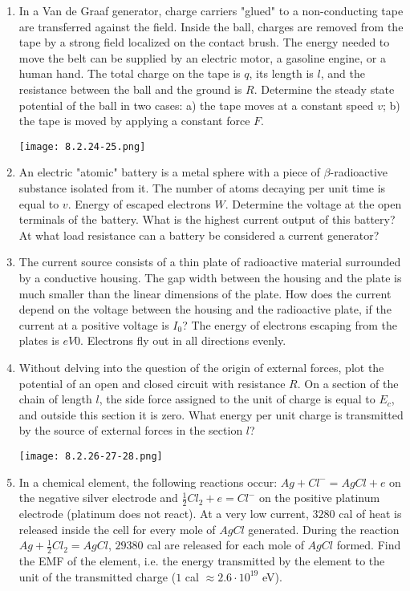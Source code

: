 \documentclass{article}
\begin{document}
\begin{enumerate}[label=8.2.\arabic*]
\item In a Van de Graaf generator, charge carriers "glued" to a non-conducting tape are transferred against the field. Inside the ball, charges are removed from the tape by a strong field localized on the contact brush. The energy needed to move the belt can be supplied by an electric motor, a gasoline engine, or a human hand. The total charge on the tape is $q$, its length is $l$, and the resistance between the ball and the ground is $R$. Determine the steady state potential of the ball in two cases: a) the tape moves at a constant speed $v$; b) the tape is moved by applying a constant force $F$.

\begin{center}
    \texttt{[image: 8.2.24-25.png]}
\end{center}

\item An electric "atomic" battery is a metal sphere with a piece of $\beta$-radioactive substance isolated from it. The number of atoms decaying per unit time is equal to $v$. Energy of escaped electrons $W$. Determine the voltage at the open terminals of the battery. What is the highest current output of this battery? At what load resistance can a battery be considered a current generator?

\item The current source consists of a thin plate of radioactive material surrounded by a conductive housing. The gap width between the housing and the plate is much smaller than the linear dimensions of the plate. How does the current depend on the voltage between the housing and the radioactive plate, if the current at a positive voltage is $I_0$? The energy of electrons escaping from the plates is $eV0$. Electrons fly out in all directions evenly.

\item Without delving into the question of the origin of external forces, plot the potential of an open and closed circuit with resistance $R$. On a section of the chain of length $l$, the side force assigned to the unit of charge is equal to $E_c$, and outside this section it is zero. What energy per unit charge is transmitted by the source of external forces in the section $l$?

\begin{center}
    \texttt{[image: 8.2.26-27-28.png]}
\end{center}

\item In a chemical element, the following reactions occur: $Ag + Cl^- = AgCl + e$ on the negative silver electrode and $\frac{1}{2} Cl_2+e = Cl^-$ on the positive platinum electrode (platinum does not react). At a very low current, $3280$ cal of heat is released inside the cell for every mole of $AgCl$ generated. During the reaction $Ag + \frac{1}{2} Cl_2 = AgCl$, $29 380$ cal are released for each mole of $AgCl$ formed. Find the EMF of the element, i.e. the energy transmitted by the element to the unit of the transmitted charge ($1$ cal $\approx 2.6 \cdot 10^{19}$ eV).


\end{enumerate}
\end{document}
